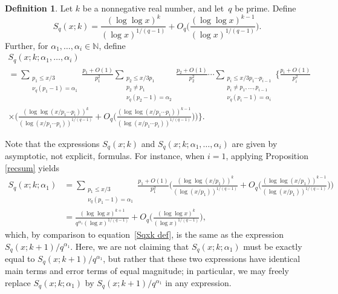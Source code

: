 \documentclass[12pt,reqno]{amsart}
\theoremstyle{definition}
\newtheorem{definition}[theorem]{Definition}
\newcommand{\N}{{\mathbb N}}
\begin{document}
\begin{definition}\label{S_q}
Let $k$ be a nonnegative real number, and let~$q$ be prime. Define
\begin{equation} \label{Sqxk def}
S_q(x;k)=\frac{(\log\log x)^k}{(\log x)^{1/(q-1)}}+O_q\bigg( \frac{(\log\log x)^{k-1}}{(\log x)^{1/(q-1)}}\bigg).
\end{equation}
Further, for $\alpha_1,\ldots,\alpha_i\in \N$, define
\begin{multline*}
S_q(x;k;\alpha_1,\ldots,\alpha_i)\\
=\sum_{\substack{p_1\le x/3\\\nu_q(p_1-1)=\alpha_1}} \frac{p_1+O(1)}{p_1^2} \sum_{\substack{p_2\le x/3p_1\\p_2\ne p_1\\\nu_q(p_2-1)=\alpha_2}} \frac{p_2+O(1)}{p_2^2} \cdots\sum_{\substack{p_{i}\le x/3p_1\cdots p_{i-1}\\p_{i}\ne p_1,\ldots,p_{i-1}\\\nu_q(p_i-1)=\alpha_i}} \bigg\{ \frac{p_i+O(1)}{p_i^2} \\
\times \bigg( \frac{(\log\log(x/p_1\cdots p_{i}))^k}{(\log(x/p_1\cdots p_{i}))^{1/(q-1)}}+O_q\bigg( \frac {(\log\log(x/p_1\cdots p_i))^{k-1}}{(\log(x/p_1\cdots p_{i}))^{1/(q-1)}}\bigg) \bigg) \bigg\}.
\end{multline*}
\end{definition}

Note that the expressions $S_q(x;k)$ and $S_q(x;k;\alpha_1,\ldots,\alpha_i)$ are given by asymptotic, not explicit, formulas. For instance, when $i=1$, applying Proposition \ref{recsum} yields
\begin{align*}
S_q(x;k;\alpha_1)&=\sum_{\substack{p_1\le x/3\\\nu_q(p_1-1)=\alpha_1}} \frac{p_1+O(1)}{p_1^2} \bigg( \frac{(\log\log(x/p_1))^k}{(\log(x/p_1))^{1/(q-1)}}+O_q\bigg( \frac {(\log\log(x/p_1))^{k-1}}{(\log(x/p_1))^{1/(q-1)}}\bigg) \bigg)\\
&=\frac{(\log\log x)^{k+1}}{q^{\alpha_1}(\log x)^{1/(q-1)}}+O_q\bigg( \frac{(\log\log x)^k}{(\log x)^{1/(q-1)}}\bigg),
\end{align*}
which, by comparison to equation~\eqref{Sqxk def}, is the same as the expression $S_q(x;k+1)/q^{\alpha_1}$.
Here, we are not claiming that $S_q(x;k;\alpha_1)$ must be exactly equal to $S_q(x;k+1)/q^{\alpha_1}$, but rather that these two expressions have identical main terms and error terms of equal magnitude; in particular, we may freely replace $S_q(x;k;\alpha_1)$ by $S_q(x;k+1)/q^{\alpha_1}$ in any expression.
\end{document}
